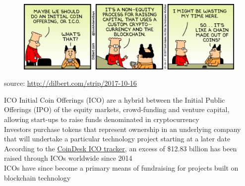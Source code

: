 \documentclass[11pt]{beamer}
\begin{document}
\begin{frame}
	\begin{figure}[]
		\centering
		\includegraphics  [scale=0.07]{Images/dilbert-ico}
	\end{figure}
	\begin{scriptsize}
		source: \href{http://dilbert.com/strip/2017-10-16}{http://dilbert.com/strip/2017-10-16}
	\end{scriptsize}
\end{frame}


\begin{frame}{ICO}
	Initial Coin Offerings (ICO) are a hybrid between the Initial Public Offerings (IPO) of the equity markets, crowd-funding and venture capital, allowing start-ups to raise funds denominated in cryptocurrency\\ \vspace{3mm}
	Investors purchase tokens that represent ownership in an underlying company that will undertake a particular technology project starting at a later date \\ \vspace{3mm}
	According to the \href{https://www.coindesk.com/ico-tracker/}{CoinDesk ICO tracker}, an excess of \$12.83 billion has been raised through ICOs worldwide since 2014 \\ \vspace{3mm}
	ICOs have since become a primary means of fundraising for projects built on blockchain technology
\end{frame}

\end{document}
